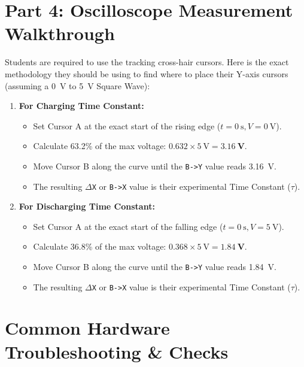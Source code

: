 \documentclass[11pt]{article}
\begin{document}
\vspace{0.2in}
\section*{Part 4: Oscilloscope Measurement Walkthrough}

Students are required to use the tracking cross-hair cursors. Here is the exact methodology they should be using to find where to place their Y-axis cursors (assuming a \SI{0}{\volt} to \SI{5}{\volt} Square Wave):

\begin{enumerate}
  \item \textbf{For Charging Time Constant:}
    \begin{itemize}
      \item Set Cursor A at the exact start of the rising edge ($t = \SI{0}{\second}, V = \SI{0}{\volt}$).
      \item Calculate 63.2\% of the max voltage: $0.632 \times \SI{5}{\volt} = \mathbf{\SI{3.16}{\volt}}$.
      \item Move Cursor B along the curve until the \texttt{B->Y} value reads \SI{3.16}{\volt}.
      \item The resulting \texttt{$\Delta$X} or \texttt{B->X} value is their experimental Time Constant ($\tau$).
    \end{itemize}
  \item \textbf{For Discharging Time Constant:}
    \begin{itemize}
      \item Set Cursor A at the exact start of the falling edge ($t = \SI{0}{\second}, V = \SI{5}{\volt}$).
      \item Calculate 36.8\% of the max voltage: $0.368 \times \SI{5}{\volt} = \mathbf{\SI{1.84}{\volt}}$.
      \item Move Cursor B along the curve until the \texttt{B->Y} value reads \SI{1.84}{\volt}.
      \item The resulting \texttt{$\Delta$X} or \texttt{B->X} value is their experimental Time Constant ($\tau$).
    \end{itemize}
\end{enumerate}

\vspace{0.2in}
\section*{Common Hardware Troubleshooting \& Checks}
\end{document}
